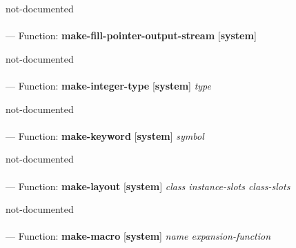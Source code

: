 \begin{adjustwidth}{5em}{5em}
not-documented
\end{adjustwidth}

\paragraph{}
\label{SYSTEM:MAKE-FILL-POINTER-OUTPUT-STREAM}
--- Function: \textbf{make-fill-pointer-output-stream} [\textbf{system}] \textit{}

\begin{adjustwidth}{5em}{5em}
not-documented
\end{adjustwidth}

\paragraph{}
\label{SYSTEM:MAKE-INTEGER-TYPE}
--- Function: \textbf{make-integer-type} [\textbf{system}] \textit{type}

\begin{adjustwidth}{5em}{5em}
not-documented
\end{adjustwidth}

\paragraph{}
\label{SYSTEM:MAKE-KEYWORD}
--- Function: \textbf{make-keyword} [\textbf{system}] \textit{symbol}

\begin{adjustwidth}{5em}{5em}
not-documented
\end{adjustwidth}

\paragraph{}
\label{SYSTEM:MAKE-LAYOUT}
--- Function: \textbf{make-layout} [\textbf{system}] \textit{class instance-slots class-slots}

\begin{adjustwidth}{5em}{5em}
not-documented
\end{adjustwidth}

\paragraph{}
\label{SYSTEM:MAKE-MACRO}
--- Function: \textbf{make-macro} [\textbf{system}] \textit{name expansion-function}

